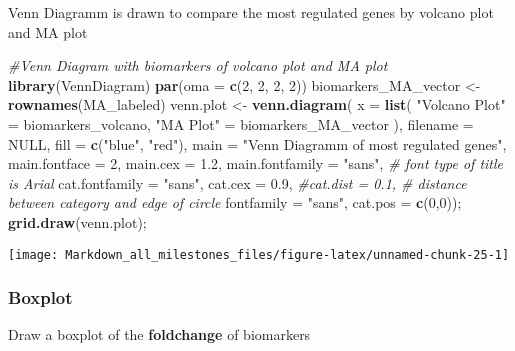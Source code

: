 \documentclass[]{article}
\newenvironment{Shaded}{\begin{snugshade}}{\end{snugshade}}
\newcommand{\CommentTok}[1]{\textcolor[rgb]{0.56,0.35,0.01}{\textit{#1}}}
\newcommand{\DataTypeTok}[1]{\textcolor[rgb]{0.13,0.29,0.53}{#1}}
\newcommand{\DecValTok}[1]{\textcolor[rgb]{0.00,0.00,0.81}{#1}}
\newcommand{\FloatTok}[1]{\textcolor[rgb]{0.00,0.00,0.81}{#1}}
\newcommand{\KeywordTok}[1]{\textcolor[rgb]{0.13,0.29,0.53}{\textbf{#1}}}
\newcommand{\NormalTok}[1]{#1}
\newcommand{\OtherTok}[1]{\textcolor[rgb]{0.56,0.35,0.01}{#1}}
\newcommand{\StringTok}[1]{\textcolor[rgb]{0.31,0.60,0.02}{#1}}
\begin{document}
Venn Diagramm is drawn to compare the most regulated genes by volcano
plot and MA plot

\begin{Shaded}
\begin{Highlighting}[]
\CommentTok{#Venn Diagram with biomarkers of volcano plot and MA plot}
\KeywordTok{library}\NormalTok{(VennDiagram)}
\KeywordTok{par}\NormalTok{(}\DataTypeTok{oma =} \KeywordTok{c}\NormalTok{(}\DecValTok{2}\NormalTok{, }\DecValTok{2}\NormalTok{, }\DecValTok{2}\NormalTok{, }\DecValTok{2}\NormalTok{))}
\NormalTok{biomarkers_MA_vector <-}\StringTok{ }\KeywordTok{rownames}\NormalTok{(MA_labeled)}
\NormalTok{venn.plot <-}\StringTok{ }\KeywordTok{venn.diagram}\NormalTok{(}
  \DataTypeTok{x =} \KeywordTok{list}\NormalTok{(}
    \StringTok{"Volcano Plot"}\NormalTok{ =}\StringTok{ }\NormalTok{biomarkers_volcano,}
    \StringTok{"MA Plot"}\NormalTok{ =}\StringTok{ }\NormalTok{biomarkers_MA_vector}
\NormalTok{    ),}
  \DataTypeTok{filename =} \OtherTok{NULL}\NormalTok{, }
  \DataTypeTok{fill =} \KeywordTok{c}\NormalTok{(}\StringTok{"blue"}\NormalTok{, }\StringTok{"red"}\NormalTok{), }
  \DataTypeTok{main =} \StringTok{"Venn Diagramm of most regulated genes"}\NormalTok{, }
  \DataTypeTok{main.fontface =} \DecValTok{2}\NormalTok{,}
  \DataTypeTok{main.cex =} \FloatTok{1.2}\NormalTok{,}
  \DataTypeTok{main.fontfamily =} \StringTok{"sans"}\NormalTok{, }\CommentTok{# font type of title is Arial }
  \DataTypeTok{cat.fontfamily =} \StringTok{"sans"}\NormalTok{,}
  \DataTypeTok{cat.cex =} \FloatTok{0.9}\NormalTok{,}
  \CommentTok{#cat.dist = 0.1, # distance between category and edge of circle}
  \DataTypeTok{fontfamily =} \StringTok{"sans"}\NormalTok{,}
  \DataTypeTok{cat.pos =} \KeywordTok{c}\NormalTok{(}\DecValTok{0}\NormalTok{,}\DecValTok{0}\NormalTok{));}
\KeywordTok{grid.draw}\NormalTok{(venn.plot);}
\end{Highlighting}
\end{Shaded}

\begin{center}\texttt{[image: Markdown\_all\_milestones\_files/figure-latex/unnamed-chunk-25-1]} \end{center}

\hypertarget{boxplot-1}{%
\subsubsection{Boxplot}\label{boxplot-1}}

Draw a boxplot of the \textbf{foldchange} of biomarkers
\end{document}
